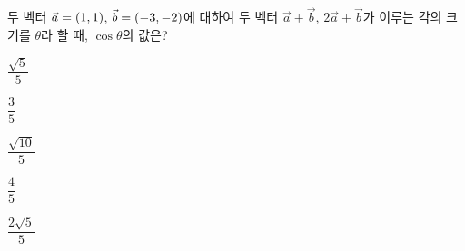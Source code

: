 두 벡터 $\vec{a}=(1{,}\mkern3mu\mathopen{}1)$, $\vec{b}=(-3{,}\mkern3mu\mathopen{}-2)$에 대하여 두 벡터 $\vec{a}+\vec{b}$, $2\vec{a}+\vec{b}$가 이루는 각의 크기를 $\theta$라 할 때, $\cos\theta$의 값은?
\begin{choices32}{\rule[-3ex]{0pt}{8ex}$\dfrac{\sqrt{5}}{5}$}{\rule[-3ex]{0pt}{8ex}$\dfrac{3}{5}$}{\rule[-3ex]{0pt}{8ex}$\dfrac{\sqrt{10}}{5}$}{\rule[-3ex]{0pt}{8ex}$\dfrac{4}{5}$}{\rule[-3ex]{0pt}{8ex}$\dfrac{2\sqrt{5}}{5}$}\end{choices32}
